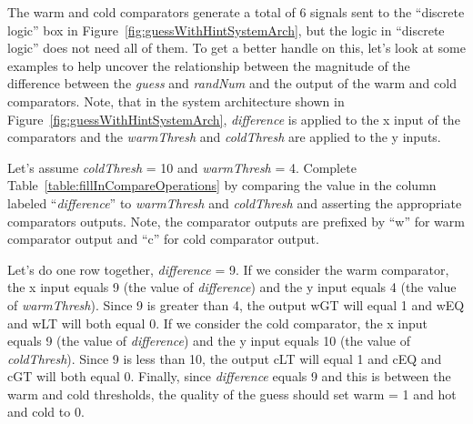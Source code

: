 The warm and cold comparators generate a total of 6 signals sent to the
``discrete logic'' box in Figure~\ref{fig:guessWithHintSystemArch}, but the logic in ``discrete logic''
does not need all of them. To get a better handle on this, let's look at
some examples to help uncover the relationship between the magnitude of
the difference between the \emph{guess} and \emph{randNum} and the
output of the warm and cold comparators. Note, that in the system
architecture shown in Figure~\ref{fig:guessWithHintSystemArch}, \emph{difference} is applied to the x
input of the comparators and the \emph{warmThresh} and \emph{coldThresh}
are applied to the y inputs.

Let's assume \emph{coldThresh} = 10 and \emph{warmThresh} = 4. Complete
Table~\ref{table:fillInCompareOperations} by comparing the value in the column labeled
``\emph{difference}'' to \emph{warmThresh} and \emph{coldThresh} and
asserting the appropriate comparators outputs. Note, the comparator
outputs are prefixed by ``w'' for warm comparator output and ``c'' for
cold comparator output.

Let's do one row together, \emph{difference} = 9. If we consider the
warm comparator, the x input equals 9 (the value of \emph{difference})
and the y input equals 4 (the value of \emph{warmThresh}). Since 9 is
greater than 4, the output wGT will equal 1 and wEQ and wLT will both
equal 0. If we consider the cold comparator, the x input equals 9 (the
value of \emph{difference}) and the y input equals 10 (the value of
\emph{coldThresh}). Since 9 is less than 10, the output cLT will equal 1
and cEQ and cGT will both equal 0. Finally, since \emph{difference}
equals 9 and this is between the warm and cold thresholds, the quality
of the guess should set warm = 1 and hot and cold to 0.

